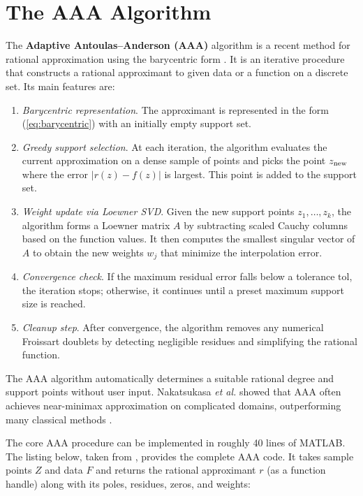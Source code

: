 \documentclass{article}
\begin{document}
\section{The AAA Algorithm}
The {\bf Adaptive Antoulas–Anderson (AAA)} algorithm is a recent method for rational approximation using the barycentric form \cite{Nakatsukasa2018}.  It is an iterative procedure that constructs a rational approximant to given data or a function on a discrete set.  Its main features are:
\begin{enumerate}
\item {\it Barycentric representation}. The approximant is represented in the form (\ref{eq:barycentric}) with an initially empty support set.
\item {\it Greedy support selection}. At each iteration, the algorithm evaluates the current approximation on a dense sample of points and picks the point $z_{\rm new}$ where the error $|r(z)-f(z)|$ is largest. This point is added to the support set.
\item {\it Weight update via Loewner SVD}. Given the new support points $z_1,\dots,z_k$, the algorithm forms a Loewner matrix $A$ by subtracting scaled Cauchy columns based on the function values.  It then computes the smallest singular vector of $A$ to obtain the new weights $w_j$ that minimize the interpolation error.
\item {\it Convergence check}. If the maximum residual error falls below a tolerance $\text{tol}$, the iteration stops; otherwise, it continues until a preset maximum support size is reached.
\item {\it Cleanup step}. After convergence, the algorithm removes any numerical Froissart doublets by detecting negligible residues and simplifying the rational function.
\end{enumerate}

The AAA algorithm automatically determines a suitable rational degree and support points without user input.  Nakatsukasa \textit{et al.} showed that AAA often achieves near-minimax approximation on complicated domains, outperforming many classical methods \cite{Nakatsukasa2018}.

The core AAA procedure can be implemented in roughly 40 lines of MATLAB.  The listing below, taken from \cite{Nakatsukasa2018}, provides the complete AAA code.  It takes sample points $Z$ and data $F$ and returns the rational approximant $r$ (as a function handle) along with its poles, residues, zeros, and weights:
\end{document}
